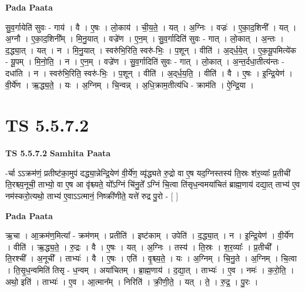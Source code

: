 \documentclass[17pt]{extarticle}
\begin{document}
\textbf{Pada Paata} \newline

सु॒व॒र्गायेति॑ सुवः - गाय॑ । वै । ए॒षः । लो॒काय॑ । ची॒य॒ते॒ । यत् । अ॒ग्निः । वज्रः॑ । ए॒का॒द॒शिनी᳚ । यत् । अ॒ग्नौ । ए॒का॒द॒शिनी᳚म् । मि॒नु॒यात् । वज्रे॑ण । ए॒न॒म् । सु॒व॒र्गादिति॑ सुवः - गात् । लो॒कात् । अ॒न्तः । द॒द्ध्या॒त् । यत् । न । मि॒नु॒यात् । स्वरु॑भि॒रिति॒ स्वरु॑-भिः॒ । प॒शून् । वीति॑ । अ॒द्‌र्ध॒ये॒त् । ए॒क॒यू॒पमित्ये॑क - यू॒पम् । मि॒नो॒ति॒ । न । ए॒न॒म् । वज्रे॑ण । सु॒व॒र्गादिति॑ सुवः - गात् । लो॒कात् । अ॒न्त॒र्दधा॒तीत्य॑न्तः - दधा॑ति । न । स्वरु॑भि॒रिति॒ स्वरु॑-भिः॒ । प॒शून् । वीति॑ । अ॒द्‌र्ध॒य॒ति॒ । वीति॑ । वै । ए॒षः । इ॒न्द्रि॒येण॑ । वी॒र्ये॑ण । ऋ॒द्ध्य॒ते॒ । यः । अ॒ग्निम् । चि॒न्वन्न् । अ॒धि॒क्राम॒तीत्य॑धि - क्राम॑ति । ऐ॒न्द्रि॒या ।  \newline




\section*{ TS 5.5.7.2 }

\textbf{TS 5.5.7.2 } \newline
\textbf{Samhita Paata} \newline

-र्चा ऽऽक्रम॑णं॒ प्रतीष्ट॑का॒मुप॑ दद्ध्या॒न्नेन्द्रि॒येण॑ वी॒र्ये॑ण॒ व्यृ॑द्ध्यते रु॒द्रो वा ए॒ष यद॒ग्निस्तस्य॑ ति॒स्रः श॑र॒व्याः᳚ प्र॒तीची॑ ति॒रश्च्य॒नूची॒ ताभ्यो॒ वा ए॒ष आ वृ॑श्च्यते॒ यो᳚ऽग्निं चि॑नु॒ते᳚ ऽग्निं चि॒त्वा ति॑सृध॒न्वमया॑चितं ब्राह्म॒णाय॑ दद्या॒त् ताभ्य॑ ए॒व नम॑स्करो॒त्यथो॒ ताभ्य॑ ए॒वाऽऽत्मानं॒ निष्क्री॑णीते॒ यत्ते॑ रुद्र पु॒रो - [  ] \newline

\textbf{Pada Paata} \newline

ऋ॒चा । आ॒क्रम॑ण॒मित्या᳚ - क्रम॑णम् । प्रतीति॑ । इष्ट॑काम् । उपेति॑ । द॒द्ध्या॒त् । न । इ॒न्द्रि॒येण॑ । वी॒र्ये॑ण । वीति॑ । ऋ॒द्ध्य॒ते॒ । रु॒द्रः । वै । ए॒षः । यत् । अ॒ग्निः । तस्य॑ । ति॒स्रः । श॒र॒व्याः᳚ । प्र॒तीची᳚ । ति॒रश्ची᳚ । अ॒नूची᳚ । ताभ्यः॑ । वै । ए॒षः । एति॑ । वृ॒श्च्य॒ते॒ । यः । अ॒ग्निम् । चि॒नु॒ते । अ॒ग्निम् । चि॒त्वा । ति॒सृ॒ध॒न्वमिति॑ तिसृ - ध॒न्वम् । अया॑चितम् । ब्रा॒ह्म॒णाय॑ । द॒द्या॒त् । ताभ्यः॑ । ए॒व । नमः॑ । क॒रो॒ति॒ । अथो॒ इति॑ । ताभ्यः॑ । ए॒व । आ॒त्मान᳚म् । निरिति॑ । क्री॒णी॒ते॒ । यत् । ते॒ । रु॒द्र॒ । पु॒रः ।  \newline
\end{document}
